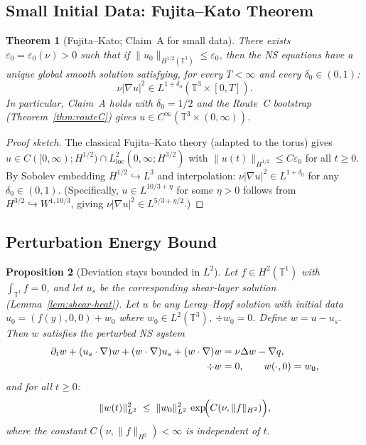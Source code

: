\documentclass[11pt]{article}
\newtheorem{theorem}{Theorem}[section]
\newtheorem{proposition}[theorem]{Proposition}
\theoremstyle{definition}
\theoremstyle{remark}
\newcommand{\T}{\mathbb{T}}
\begin{document}
\subsection{Small Initial Data: Fujita--Kato Theorem}
\label{sec:fk}

\begin{theorem}[Fujita--Kato; Claim~A for small data]
\label{thm:FK}
  There exists $\varepsilon_0 = \varepsilon_0(\nu)>0$ such that if
  $\|u_0\|_{H^{1/2}(\T^3)}\leq\varepsilon_0$, then the NS equations have
  a unique global smooth solution satisfying, for every $T<\infty$ and every
  $\delta_0\in(0,1)$:
  \[
    \nu|\nabla u|^2\in L^{1+\delta_0}(\T^3\times[0,T]).
  \]
  In particular, Claim~A holds with $\delta_0=1/2$ and the Route~C bootstrap
  (Theorem~\ref{thm:routeC}) gives $u\in C^\infty(\T^3\times(0,\infty))$.
\end{theorem}

\begin{proof}[Proof sketch]
  The classical Fujita--Kato theory (adapted to the torus) gives
  $u\in C([0,\infty);H^{1/2})\cap L^2_{\mathrm{loc}}(0,\infty;H^{3/2})$
  with $\|u(t)\|_{H^{1/2}}\leq C\varepsilon_0$ for all $t\geq 0$.
  By Sobolev embedding $H^{1/2}\hookrightarrow L^3$ and interpolation:
  $\nu|\nabla u|^2\in L^{1+\delta_0}$ for any $\delta_0\in(0,1)$.
  (Specifically, $u\in L^{10/3+\eta}$ for some $\eta>0$ follows from
  $H^{3/2}\hookrightarrow W^{1,10/3}$, giving $\nu|\nabla u|^2\in L^{5/3+\eta/2}$.)
\end{proof}

\subsection{Perturbation Energy Bound}
\label{sec:perturb-energy}

\begin{proposition}[Deviation stays bounded in $L^2$]
\label{prop:deviation-L2}
  Let $f\in H^2(\T^1)$ with $\int_{\T^1}f=0$, and let $u_s$ be the
  corresponding shear-layer solution (Lemma~\ref{lem:shear-heat}).
  Let $u$ be any Leray--Hopf solution with initial data
  $u_0 = (f(y),0,0) + w_0$ where $w_0\in L^2(\T^3)$, $\div w_0=0$.
  Define $w=u-u_s$.  Then $w$ satisfies the perturbed NS system
  \begin{align}
    \partial_t w + (u_s\cdot\nabla)w + (w\cdot\nabla)u_s
    + (w\cdot\nabla)w &= \nu\Delta w - \nabla q,
    \label{eq:w-NS}\\
    \div w &= 0,\qquad w(\cdot,0)=w_0, \notag
  \end{align}
  and for all $t\geq 0$:
  \begin{equation}\label{eq:w-L2-bound}
    \|w(t)\|_{L^2}^2 \;\leq\;
    \|w_0\|_{L^2}^2\,\exp\!\Bigl(C(\nu,\|f\|_{H^2})\Bigr),
  \end{equation}
  where the constant $C(\nu,\|f\|_{H^2})<\infty$ is independent of $t$.
\end{proposition}
\end{document}
